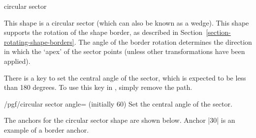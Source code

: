 \begin{shape}{circular sector}

	This shape is a circular sector (which can also be known as a
	wedge).
	This shape supports the rotation of the shape border,
	as described in Section~\ref{section-rotating-shape-borders}.
	The angle of the border rotation determines the direction in which
	the `apex' of the sector points (unless other transformations have
	been applied).
	
\begin{codeexample}[]
\end{codeexample}

	There is a \pgfname{} key to set the central angle of the sector,
	which is expected to be less than 180 degrees.
	To use this key in \tikzname,	simply remove the 
	path.
	
	\begin{key}{/pgf/circular sector angle= (initially 60)}
		Set the central angle of the sector.
	\end{key}
	
	The anchors for the circular sector shape are shown below.
	Anchor |30| is an example of a border anchor.
	
\begin{codeexample}[]
\Huge
{}
\end{codeexample}
\end{shape}




